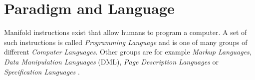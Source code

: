%
%
%
%
%
%
%

\section{Paradigm and Language}
\label{paradigm_and_language_heading}

Manifold instructions exist that allow humans to program a computer. A set of
such instructions is called \emph{Programming Language} and is one of many
groups of different \emph{Computer Languages}. Other groups are for example
\emph{Markup Languages}, \emph{Data Manipulation Languages} (DML),
\emph{Page Description Languages} or \emph{Specification Languages}
\cite{wikipedia}.
















